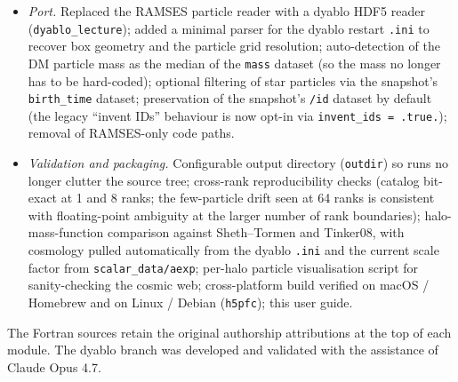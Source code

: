 \documentclass[11pt,a4paper]{article}
\begin{document}
\begin{itemize}\itemsep0pt
  \item \emph{Port.} Replaced the RAMSES particle reader with a dyablo HDF5
        reader (\texttt{dyablo\_lecture}); added a minimal parser for the
        dyablo restart \texttt{.ini} to recover box geometry and the particle
        grid resolution; auto-detection of the DM particle mass as the median
        of the \texttt{mass} dataset (so the mass no longer has to be
        hard-coded); optional filtering of star particles via the snapshot's
        \texttt{birth\_time} dataset; preservation of the snapshot's
        \texttt{/id} dataset by default (the legacy ``invent IDs'' behaviour
        is now opt-in via \texttt{invent\_ids = .true.}); removal of RAMSES-only
        code paths.
  \item \emph{Validation and packaging.} Configurable output directory
        (\texttt{outdir}) so runs no longer clutter the source tree;
        cross-rank reproducibility checks (catalog bit-exact at 1 and 8 ranks;
        the few-particle drift seen at 64 ranks is consistent with
        floating-point ambiguity at the larger number of rank boundaries);
        halo-mass-function comparison against Sheth--Tormen and Tinker08, with
        cosmology pulled automatically from the dyablo \texttt{.ini} and the
        current scale factor from \texttt{scalar\_data/aexp}; per-halo
        particle visualisation script for sanity-checking the cosmic web;
        cross-platform build verified on macOS / Homebrew and on Linux /
        Debian (\texttt{h5pfc}); this user guide.
\end{itemize}

\noindent The Fortran sources retain the original authorship attributions at
the top of each module. The dyablo branch was developed and validated with
the assistance of Claude Opus 4.7.
\end{document}
